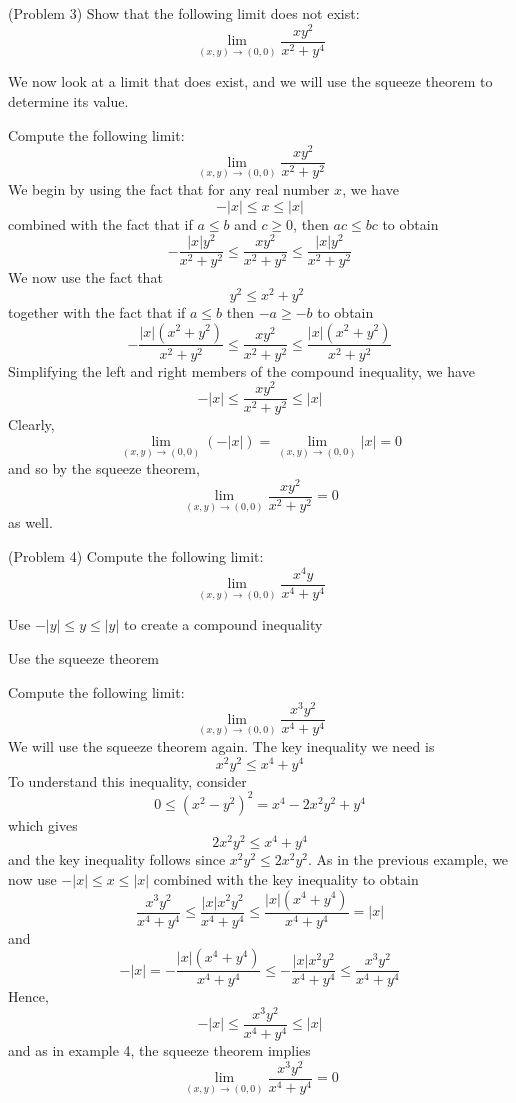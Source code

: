\documentclass[handout]{ximera}
\begin{document}
\begin{problem}(Problem 3)
Show that the following limit does not exist:
\[
\lim_{(x,y) \to (0,0)} \frac{xy^2}{x^2 + y^4}
\]
\end{problem}


We now look at a limit that does exist, and we will use the squeeze theorem to determine its value.

\begin{example}[Example 4]
Compute the following limit:
\[
\lim_{(x,y) \to (0,0)} \frac{xy^2}{x^2 + y^2}
\]
We begin by using the fact that for any real number $x$, we have
\[
-|x| \leq x \leq |x| 
\]
combined with the fact that if $a\leq b$ and $c\geq 0$, then $ac \leq bc$ to obtain
\[
-\frac{|x|y^2}{x^2 + y^2} \leq \frac{xy^2}{x^2 + y^2} \leq \frac{|x|y^2}{x^2 + y^2}
\]
We now use the fact that
\[
\quad y^2 \leq x^2 + y^2
\]
together with the fact that if $a \leq b$ then $-a \geq -b$ to obtain
\[
-\frac{|x|(x^2 + y^2)}{x^2 + y^2} \leq \frac{xy^2}{x^2 + y^2} \leq \frac{|x|(x^2 + y^2)}{x^2 + y^2}
\]
Simplifying the left and right members of the compound inequality, we have
\[
-|x| \leq \frac{xy^2}{x^2 + y^2} \leq |x|
\]
Clearly, 
\[
\lim_{(x,y) \to (0,0)} (-|x|) = \lim_{(x,y) \to (0,0)} |x| = 0
\]
and so by the squeeze theorem, 
\[
\lim_{(x,y) \to (0,0)} \frac{xy^2}{x^2 + y^2} =0
\]
as well.
\end{example}

\begin{problem}(Problem 4)
Compute the following limit:
\[
\lim_{(x,y) \to (0,0)} \frac{x^4y}{x^4 + y^4}
\]
\begin{hint}
Use $-|y| \leq y \leq |y|$ to create a compound inequality
\end{hint}
\begin{hint}
Use the squeeze theorem
\end{hint}
\end{problem}

\begin{example}[Example 5]
Compute the following limit:
\[
\lim_{(x,y) \to (0,0)} \frac{x^3y^2}{x^4 + y^4}
\]
We will use the squeeze theorem again.  The key inequality we need is
\[
x^2y^2 \leq x^4 + y^4 
\]
To understand this inequality, consider
\[
0 \leq (x^2 - y^2)^2 = x^4 -2x^2y^2 + y^4
\]
which gives
\[
2x^2y^2 \leq x^4 + y^4
\]
and the key inequality follows since $x^2y^2 \leq 2x^2y^2$.
As in the previous example, we now use $-|x| \leq x \leq |x|$ combined with the key inequality to obtain
\[
\frac{x^3y^2}{x^4 + y^4} \leq \frac{|x|x^2y^2}{x^4 + y^4} \leq \frac{|x|(x^4 + y^4)}{x^4 + y^4} = |x|
\]
and 
\[
-|x| = -\frac{|x|(x^4 + y^4)}{x^4 + y^4} \leq -\frac{|x|x^2y^2}{x^4 + y^4} \leq \frac{x^3y^2}{x^4 + y^4}
\]
Hence,
\[
-|x| \leq \frac{x^3y^2}{x^4 + y^4} \leq |x|
\]
and as in example 4, the squeeze theorem implies
\[
\lim_{(x,y) \to (0,0)} \frac{x^3y^2}{x^4 + y^4} = 0
\]
\end{example}
\end{document}
